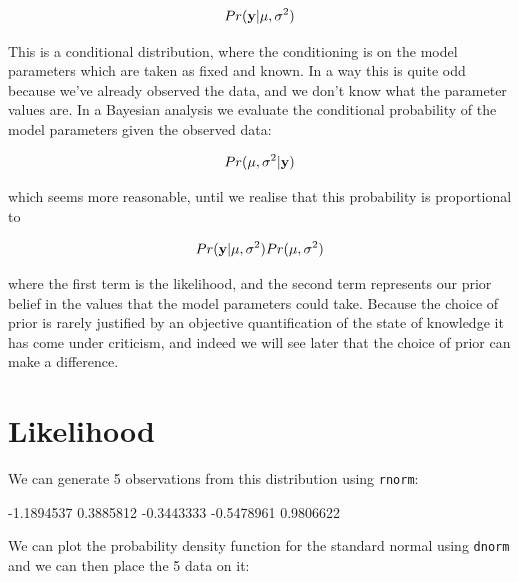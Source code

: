 \documentclass{article}
\begin{document}
\begin{displaymath}
Pr({\bf y} | \mu, \sigma^{2})
\end{displaymath}

This is a conditional distribution, where the conditioning is on the model parameters which are taken as fixed and known. In a way this is quite odd because we've already observed the data, and we don't know what the parameter values are. In a Bayesian analysis we evaluate the conditional probability of the model parameters given the observed data:

\begin{displaymath}
Pr(\mu, \sigma^{2} | {\bf y})
\label{post1-eq}
\end{displaymath}
 
which seems more reasonable, until we realise that this probability is proportional to 

\begin{displaymath}
Pr({\bf y} | \mu, \sigma^{2})Pr(\mu, \sigma^{2})
\end{displaymath}

where the first term is the likelihood, and the second term represents our prior belief in the values that the model parameters could take. Because the choice of prior is rarely justified by an objective quantification of the state of knowledge it has come under criticism, and indeed we will see later that the choice of prior can make a difference. 

\section{Likelihood}

We can generate 5 observations from this distribution using \texttt{rnorm}:

\begin{Schunk}
\begin{Soutput}
[1] -1.1894537  0.3885812 -0.3443333 -0.5478961  0.9806622
\end{Soutput}
\end{Schunk}

We can plot the probability density function for the standard normal using \texttt{dnorm} and we can then place the 5 data on it:
\end{document}
